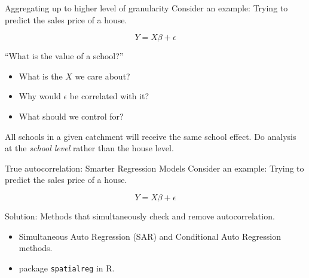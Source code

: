 \documentclass[
  8pt,
  ignorenonframetext,
]{beamer}
\providecommand{\tightlist}{%
  \setlength{\itemsep}{0pt}\setlength{\parskip}{0pt}}
\begin{document}
\begin{frame}{Aggregating up to higher level of granularity}
\protect\hypertarget{aggregating-up-to-higher-level-of-granularity}{}
Consider an example: Trying to predict the sales price of a house.

\[Y = X\beta + \epsilon\]

``What is the value of a school?''

\begin{itemize}
\tightlist
\item
  What is the \(X\) we care about?
\item
  Why would \(\epsilon\) be correlated with it?
\item
  What should we control for?
\end{itemize}

\pause

All schools in a given catchment will receive the same school effect. Do
analysis at the \emph{school level} rather than the house level.
\end{frame}

\begin{frame}[fragile]{True autocorrelation: Smarter Regression Models}
\protect\hypertarget{true-autocorrelation-smarter-regression-models}{}
Consider an example: Trying to predict the sales price of a house.

\[Y = X\beta + \epsilon\]

Solution: Methods that simultaneously check and remove autocorrelation.

\begin{itemize}
\tightlist
\item
  Simultaneous Auto Regression (SAR) and Conditional Auto Regression
  methods.
\item
  package \texttt{spatialreg} in R.
\end{itemize}
\end{frame}
\end{document}
